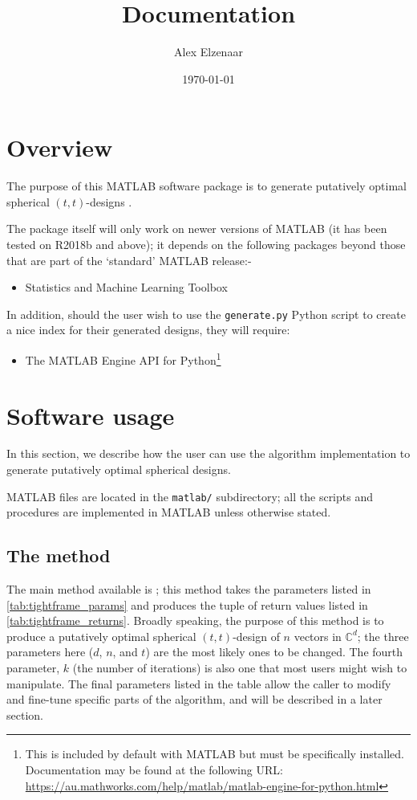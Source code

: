 \documentclass{article}
\title{Documentation}
\author{Alex Elzenaar}
\date{\today}
\newcommand{\C}{\mathbb{C}}
\theoremstyle{definition}
\begin{document}
  \maketitle

  \tableofcontents

  \section{Overview}
  The purpose of this MATLAB software package is to generate putatively optimal
  spherical $(t,t)$-designs \autocite{waldron2018}.

  The package itself will only work on newer versions of MATLAB (it has been tested
  on R2018b and above); it depends on the following packages beyond those that are
  part of the `standard' MATLAB release:-
  \begin{itemize}
    \item Statistics and Machine Learning Toolbox
  \end{itemize}

  In addition, should the user wish to use the \texttt{generate.py} Python script to create
  a nice index for their generated designs, they will require:
  \begin{itemize}
    \item The MATLAB Engine API for Python\footnote{This is included by default with MATLAB but must be specifically installed. Documentation may be found at the
          following URL: \url{https://au.mathworks.com/help/matlab/matlab-engine-for-python.html}}
  \end{itemize}

  \section{Software usage}
  In this section, we describe how the user can use the algorithm implementation to generate
  putatively optimal spherical designs.

  MATLAB files are located in the \texttt{matlab/} subdirectory; all the scripts and procedures
  are implemented in MATLAB unless otherwise stated.

  \subsection{The  method}
  The main method available is ; this method takes the parameters
  listed in \cref{tab:tightframe_params} and produces the tuple of return values listed
  in \cref{tab:tightframe_returns}. Broadly speaking, the purpose of this method is to
  produce a putatively optimal spherical $(t,t)$-design of $ n $ vectors in $ \C^d $; the
  three parameters here ($ d $, $ n $, and $ t $) are the most likely ones to be changed.
  The fourth parameter, $ k $ (the number of iterations) is also one that most users might
  wish to manipulate. The final parameters listed in the table allow the caller
  to modify and fine-tune specific parts of the algorithm, and will be described in a later section.
\end{document}
